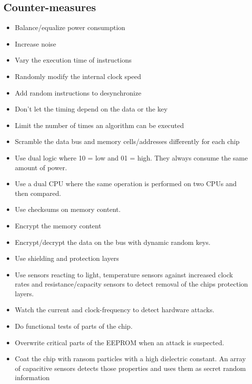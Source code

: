 \subsection{Counter-measures}
\begin{mytitle} \hfill
\begin{itemize}
    \item Balance/equalize power consumption
    \item Increase noise
    \item Vary the execution time of instructions
    \item Randomly modify the internal clock speed
\end{itemize}
\end{mytitle}
\begin{mytitle}\hfill
\begin{itemize}
    \item Add random instructions to desynchronize
    \item Don't let the timing depend on the data or the key
    \item Limit the number of times an algorithm can be executed
\end{itemize}
\end{mytitle}
\begin{mytitle}\hfill
\begin{itemize}
    \item Scramble the data bus and memory cells/addresses differently for each chip
    \item Use dual logic where 10 = low and 01 = high. They always consume the same amount of power.
    \item Use a dual CPU where the same operation is performed on two CPUs and then compared.
    \item Use checksums on memory content.
    \item Encrypt the memory content
    \item Encrypt/decrypt the data on the bus with dynamic random keys.
    \item Use shielding and protection layers
\end{itemize}
\end{mytitle}
\begin{mytitle}\hfill
\begin{itemize}
    \item Use sensors reacting to light, temperature sensors against increased clock rates and resistance/capacity sensors to detect removal of the chips protection layers.
    \item Watch the current and clock-frequency to detect hardware attacks.
    \item Do functional tests of parts of the chip.
    \item Overwrite critical parts of the EEPROM when an attack is suspected.
    \item Coat the chip with ransom particles with a high dielectric constant. An array of capacitive sensors detects those properties and uses them as secret random information
\end{itemize}
\end{mytitle}